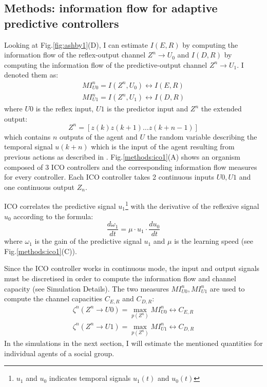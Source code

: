 \subsection{Methods: information flow for adaptive predictive controllers}
Looking at Fig.\ref{fig:ashby1}(D), I can estimate $I(E,R)$ by computing the
information flow of the reflex-output channel $Z^n \rightarrow  U_0$ and $I(D,R)$
by computing the information flow of the predictive-output channel $Z^n \rightarrow  U_1$.
I denoted them as:
\begin{eqnarray}
MI^n_{U0}=I(Z^n,U_0) \leftrightarrow I(E,R)\label{eq.mi0}\\
MI^n_{U1}=I(Z^n,U_1) \leftrightarrow I(D,R)\label{eq.mi1}
\end{eqnarray}
where $U0$ is the reflex input, $U1$ is the predictor input and
$Z^{n}$ the extended output:
\begin{equation}
Z^n=[z(k) z(k+1)\dots z(k+n-1)]
\end{equation}
which contains $n$ outputs of the agent and $U$ the random variable describing the
temporal signal $u(k+n)$ which is the input of the agent resulting from
previous actions as described in \citet{organizationInfo,quantifyInfo}.
Fig.\ref{methods:ico1}(A) shows an organism composed of 3 ICO \citep{Porr2006ICO}
controllers and the corresponding information flow measures for every controller.
Each ICO controller takes 2 continuous inputs $U0,U1$ and one continuous output $Z_{n}$.

ICO correlates the predictive signal $u_{1}$\footnote{$u_{1}$ and $u_{0}$ indicates
temporal signals $u_{1}(t)$ and $u_{0}(t)$} with the derivative of
the reflexive signal $u_{0}$ according to the formula:
\begin{equation}
 \frac{d\omega_1}{dt}=\mu \cdot u_1 \cdot \frac{du_0}{dt}
\end{equation}
where $\omega_1$ is the gain of the predictive signal $u_{1}$ and $\mu$ is the
learning speed (see Fig.\ref{methods:ico1}(C)).

Since the ICO controller works in continuous mode, the input and output signals
must be discretised in order to compute the information flow and channel capacity (see Simulation Details).
The two measures $MI^n_{U0},MI^n_{U1}$ are used to compute the channel capacities $C_{E,R}$ and $C_{D,R}$:
\begin{eqnarray}
\zeta^n(Z^n \rightarrow U0)=\max_{p(Z^n) } MI^n_{U0}  \leftrightarrow C_{E,R} \label{eq:c0}\\
\zeta^n(Z^n \rightarrow U1)=\max_{p(Z^n) } MI^n_{U1}   \leftrightarrow C_{D,R} \label{eq.c1}
\end{eqnarray}
In the simulations in the next section, I will estimate the mentioned quantities
for individual agents of a social group.

